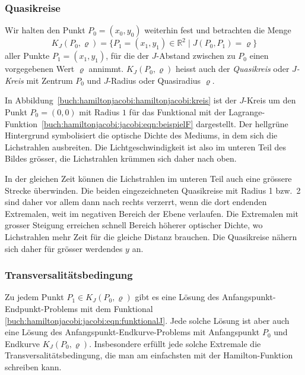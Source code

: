 %
%
\subsubsection{Quasikreise}
Wir halten den Punkt $P_0=(x_0,y_0)$ weiterhin fest und betrachten die
Menge
\[
K_J(P_0,\varrho)
=
\{
P_1=(x_1,y_1)\in\mathbb{R}^2
\mid
J(P_0,P_1) = \varrho
\}
\]
aller Punkte $P_1=(x_1,y_1)$, für die der $J$-Abstand zwischen
zu $P_0$ einen vorgegebenen Wert $\varrho$ annimmt.
$K_J(P_0,\varrho)$ heisst auch der {\em Quasikreis} oder {\em $J$-Kreis}
mit Zentrum $P_0$ und $J$-Radius oder Quasiradius $\varrho$.

\begin{beispiel}
In Abbildung~\ref{buch:hamiltonjacobi:hamiltonjacobi:kreis} ist der
$J$-Kreis um den Punkt $P_0=(0,0)$ mit Radius $1$ für das Funktional
mit der Lagrange-Funktion~\eqref{buch:hamiltonjacobi:jacobi:eqn:beispielF}
dargestellt.
Der hellgrüne Hintergrund symbolisiert die optische Dichte des Mediums,
in dem sich die Lichstrahlen ausbreiten.
Die Lichtgeschwindigkeit ist also im unteren Teil des Bildes grösser,
die Lichstrahlen krümmen sich daher nach oben.

In der gleichen Zeit können die Lichstrahlen im unteren Teil auch
eine grössere Strecke überwinden.
Die beiden eingezeichneten Quasikreise mit Radius 1 bzw.~2 sind 
daher vor allem dann nach rechts verzerrt, wenn die dort
endenden Extremalen, weit im negativen Bereich der Ebene verlaufen.
Die Extremalen mit grosser Steigung erreichen schnell Bereich höherer
optischer Dichte, wo Lichstrahlen mehr Zeit für die gleiche Distanz
brauchen.
Die Quasikreise nähern sich daher für grösser werdendes $y$ an.
\end{beispiel}

%
%
\subsubsection{Transversalitätsbedingung}
Zu jedem Punkt $P_1\in K_J(P_0,\varrho)$ gibt es eine Lösung des
Anfangspunkt-Endpunkt-Problems mit dem Funktional
\eqref{buch:hamiltonjacobi:jacobi:eqn:funktionalJ}.
Jede solche Lösung ist aber auch eine Lösung des
Anfangspunkt-Endkurve-Problems mit Anfangspunkt $P_0$ und
Endkurve $K_J(P_0,\varrho)$.
Insbesondere erfüllt jede solche Extremale die Transversalitätsbedingung,
die man am einfachsten mit der Hamilton-Funktion schreiben kann.

